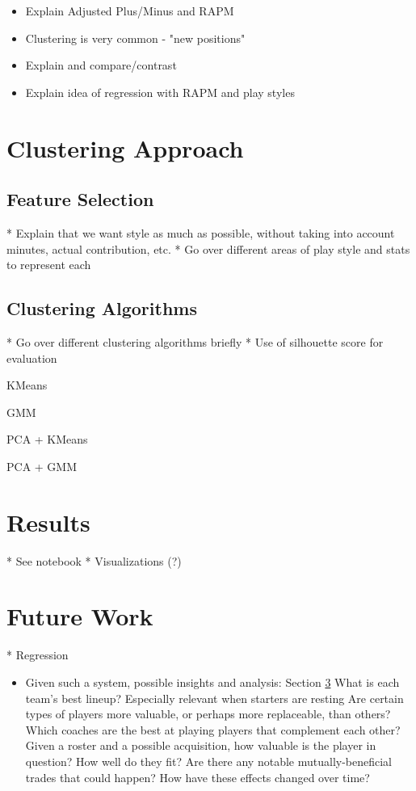 \documentclass[12pt]{article}
\begin{document}
\begin{itemize}
	\item Explain Adjusted Plus/Minus and RAPM
	\item Clustering is very common - "new positions"
	\item Explain and compare/contrast \cite{maymin_2012}
	\item Explain idea of regression with RAPM and play styles
\end{itemize}

\section{Clustering Approach} \label{clustering}

\subsection{Feature Selection} \label{features}

* Explain that we want style as much as possible, without taking into account
minutes, actual contribution, etc.
* Go over different areas of play style and stats to represent each

\subsection{Clustering Algorithms} \label{algos}

* Go over different clustering algorithms briefly
* Use of silhouette score for evaluation \cite{rousseeuw_1987}

KMeans

GMM

PCA + KMeans

PCA + GMM

\section{Results} \label{results}

* See notebook
* Visualizations (?)

\section{Future Work} \label{future}

* Regression
\begin{itemize}
	\item Given such a system, possible insights and analysis: Section \ref{future}
		\subitem What is each team's best lineup? Especially relevant when starters
		are resting
		\subitem Are certain types of players more valuable, or perhaps more
		replaceable, than others?
		\subitem Which coaches are the best at playing players that complement each
		other?
		\subitem Given a roster and a possible acquisition, how valuable is the
		player in question? How well do they fit?
		\subitem Are there any notable mutually-beneficial trades that could happen?
		\subitem How have these effects changed over time?
\end{itemize}



\end{document}
